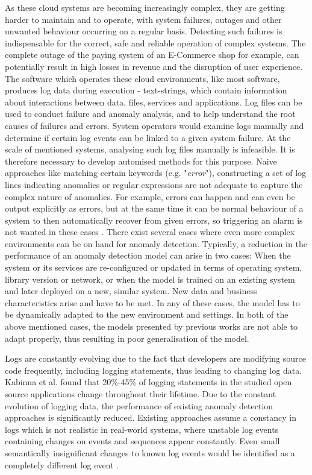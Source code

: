 As these cloud systems are becoming increasingly complex, they are getting harder to maintain and to operate, with system failures, outages and other unwanted behaviour occurring on a regular basis. Detecting such failures is indispensable for the correct, safe and reliable operation of complex systems. The complete outage of the paying system of an E-Commerce shop for example, can potentially result in high losses in revenue and the disruption of user experience. The software which operates these cloud environments, like most software, produces log data during execution - text-strings, which contain information about interactions between data, files, services and applications. Log files can be used to conduct failure and anomaly analysis, and to help understand the root causes of failures and errors. System operators would examine logs manually and determine if certain log events can be linked to a given system failure. At the scale of mentioned systems, analysing such log files manually is infeasible. It is therefore necessary to develop automised methods for this purpose. Naive approaches like matching certain keywords (e.g. "\textit{error}"), constructing a set of log lines indicating anomalies or regular expressions are not adequate to capture the complex nature of anomalies. For example, errors can happen and can even be output explicitly as errors, but at the same time it can be normal behaviour of a system to then automatically recover from given errors, so triggering an alarm is not wanted in these cases \cite{meng2019loganomaly}. 
There exist several cases where even more complex environments can be on hand for anomaly detection. Typically, a reduction in the performance of an anomaly detection model can arise in two cases: When the system or its services are re-configured or updated in terms of operating system, library version or network, or when the model is trained on an existing system and later deployed on a new, similar system. New data and business characteristics arise and have to be met. In any of these cases, the model has to be dynamically adapted to the new environment and settings. In both of the above mentioned cases, the models presented by previous works are not able to adapt properly, thus resulting in poor generalisation of the model.

Logs are constantly evolving due to the fact that developers are modifying source code frequently, including logging statements, thus leading to changing log data. Kabinna et al. \cite{kabinna2018examining} found that 20\%-45\% of logging statements in the studied open source applications change throughout their lifetime. Due to the constant evolution of logging data, the performance of existing anomaly detection approaches is significantly reduced. Existing approaches assume a constancy in logs which is not realistic in real-world systems, where unstable log events containing changes on events and sequences appear constantly. Even small semantically insignificant changes to known log events would be identified as a completely different log event \cite{du2017deeplog} \cite{meng2019loganomaly} \cite{zhang2016automated}. 

